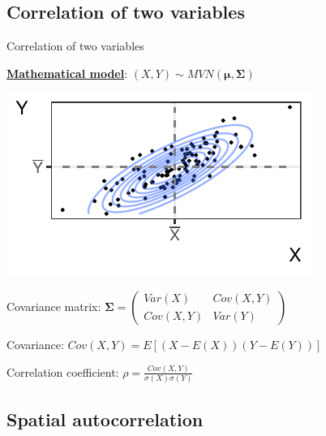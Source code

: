 \documentclass[
  ignorenonframetext,
]{beamer}
\begin{document}
\hypertarget{correlation-of-two-variables-1}{%
\subsection{Correlation of two
variables}\label{correlation-of-two-variables-1}}

\begin{frame}{Correlation of two variables}
\small

\href{https://distill.pub/2019/visual-exploration-gaussian-processes/}{\textbf{Mathematical
model}}: \((X,Y) \sim MVN(\boldsymbol\mu, \boldsymbol\Sigma)\)

\includegraphics{Lecture_1_files/figure-beamer/unnamed-chunk-3-1.pdf}

Covariance matrix:
\(\boldsymbol\Sigma=\begin{pmatrix}Var(X) & Cov(X,Y)\\Cov(X,Y) & Var(Y)\end{pmatrix}\)

Covariance: \(Cov(X,Y)=E[(X-E(X))(Y-E(Y))]\)

Correlation coefficient: \(\rho = \frac{Cov(X,Y)}{\sigma(X)\sigma(Y)}\)
\end{frame}

\hypertarget{spatial-autocorrelation}{%
\subsection{Spatial autocorrelation}\label{spatial-autocorrelation}}
\end{document}
